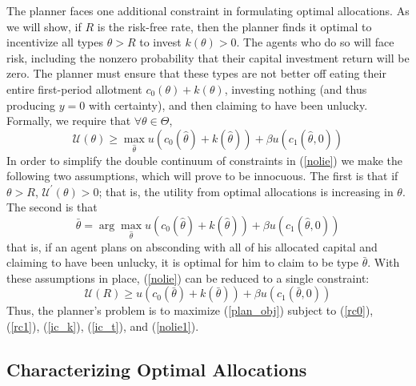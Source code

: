 \documentclass[11pt]{article}
\newcommand{\p}{\prime}
\newcommand{\U}{\mathcal{U}}
\begin{document}
The planner faces one additional constraint in formulating optimal allocations. As we will show, if \( R \) is the risk-free rate, then the planner finds it optimal to incentivize all types \( \theta > R \) to invest \( k(\theta)>0 \). The agents who do so will face risk, including the nonzero probability that their capital investment return will be zero. The planner must ensure that these types are not better off eating their entire first-period allotment \( c_0(\theta) + k(\theta) \), investing nothing (and thus producing \( y = 0 \) with certainty), and then claiming to have been unlucky. Formally, we require that \( \forall\theta\in\Theta \),
\begin{equation}
    \U(\theta)\geq \max_{\hat{\theta}} u\left( c_0(\hat{\theta}) + k(\hat{\theta}) \right) + \beta u\left( c_1(\hat{\theta},0) \right) \label{nolie}
\end{equation}
In order to simplify the double continuum of constraints in (\ref{nolie}) we make the following two assumptions, which will prove to be innocuous. The first is that if \( \theta > R \), \( \U^\p(\theta) > 0 \); that is, the utility from optimal allocations is increasing in \( \theta \). The second is that 
\begin{equation}
    \bar{\theta} = \arg \max_{\hat{\theta}} u\left( c_0(\hat{\theta}) + k(\hat{\theta}) \right) + \beta u\left( c_1(\hat{\theta},0) \right) 
\end{equation}
that is, if an agent plans on absconding with all of his allocated capital and claiming to have been unlucky, it is optimal for him to claim to be type \( \bar{\theta} \). With these assumptions in place, (\ref{nolie}) can be reduced to a single constraint:
\begin{equation}
    \U(R)\geq u\left( c_0(\bar{\theta}) + k(\bar{\theta}) \right) + \beta u\left( c_1(\bar{\theta},0) \right) \label{nolie1}
\end{equation}
Thus, the planner's problem is to maximize (\ref{plan_obj}) subject to (\ref{rc0}), (\ref{rc1}), (\ref{ic_k}), (\ref{ic_t}), and (\ref{nolie1}).

\subsection{Characterizing Optimal Allocations}
\end{document}
